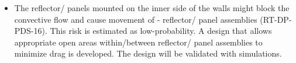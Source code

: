 \begin{itemize}
\item The reflector/ panels mounted on the inner side of the  walls might block the  convective flow and cause movement of  - reflector/ panel assemblies (RT-DP-PDS-16). This risk is estimated as low-probability. A design that allows appropriate open areas within/between reflector/ panel assemblies to minimize drag is developed. The design will be validated with  simulations.


\end{itemize}

